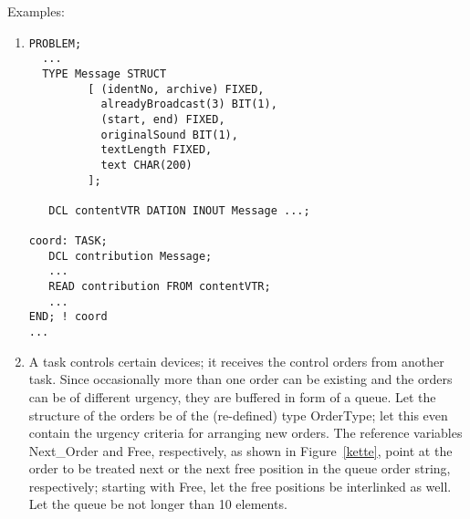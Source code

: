 Examples:
\begin{enumerate}
\item
\begin{lstlisting}
PROBLEM;
  ...
  TYPE Message STRUCT
         [ (identNo, archive) FIXED,
           alreadyBroadcast(3) BIT(1),
           (start, end) FIXED,
           originalSound BIT(1),
           textLength FIXED,
           text CHAR(200)
         ];
          
   DCL contentVTR DATION INOUT Message ...;
          
coord: TASK;
   DCL contribution Message;
   ...
   READ contribution FROM contentVTR;
   ...
END; ! coord
...     
\end{lstlisting}
\item A task controls certain devices; it receives the control orders
from another task. Since occasionally more than one order can be
existing and the orders can be of different urgency, they are buffered
in form of a queue. Let the structure of the orders be of the (re-defined)
type OrderType; let this even contain the urgency criteria for
arranging new orders. The reference variables Next\_Order and Free,
respectively, as shown in Figure~\ref{kette}, point at the order to be treated next or the next free position
in the queue order string, respectively; starting with Free, let the free
positions be interlinked as well. Let the queue be not longer than 10
elements.



\end{enumerate}
